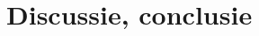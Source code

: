 \documentclass{hogent-article}
\begin{document}

\lipsum[14-18]

\section{Discussie, conclusie}%
\label{sec:discussie-conclusie}

\lipsum[19-21]


\printbibliography[heading=bibintoc]
\end{document}
